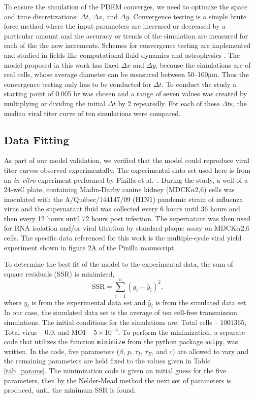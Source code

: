 To ensure the simulation of the PDEM converges, we need to optimize the space and time discretizations: $\Delta t$, $\Delta x$, and $\Delta y$. Convergence testing is a simple brute force method where the input parameters are increased or decreased by a particular amount and the accuracy or trends of the simulation are measured for each of the the new increments. Schemes for convergence testing are implemented and studied in fields like computational fluid dynamics \citep{bermejo16,kim20fluid} and astrophysics \citep{xu21,banei21}. The model proposed in this work has fixed $\Delta x$ and $\Delta y$, because the simulations are of real cells, whose average diameter can be measured between \numrange[range-phrase = --]{50}{100}\si{\micro\meter}. Thus the convergence testing only has to be conducted for $\Delta t$. To conduct the study a starting point of 0.005 hr was chosen and a range of seven values was created by multiplying or dividing the initial $\Delta t$ by 2 repeatedly. For each of these $\Delta t$s, the median viral titer curve of ten simulations were compared.

\subsection{Data Fitting} \label{Data_Fitting}

As part of our model validation, we verified that the model could reproduce viral titer curves observed experimentally. The experimental data set used here is from an \emph{in vitro} experiment performed by Pinilla et al.\ \citep{pinilla12}. During the study, a well of a 24-well plate, containing Madin-Darby canine kidney (MDCK$\alpha$2,6) cells was inoculated with the A/Qu\'{e}bec/144147/09 (H1N1) pandemic strain of influenza virus and the supernatant fluid was collected every 6 hours until 36 hours and then every 12 hours until 72 hours post infection. The supernatant was then used for RNA isolation and/or viral titration by standard plaque assay on MDCK$\alpha$2,6 cells. The specific data referenced for this work is the multiple-cycle viral yield experiment shown in figure 2A of the Pinilla manuscript.

To determine the best fit of the model to the experimental data, the sum of square residuals (SSR) is minimized, $$\mathrm{SSR} = \sum_{i=1}^{n} (y_i - \hat y_i)^{2},$$ where $y_i$ is from the experimental data set and $\hat y_i$ is from the simulated data set. In our case, the simulated data set is the average of ten cell-free transmission simulations. The initial conditions for the simulations are: Total cells -- $1001365$, Total virus -- $0.0$, and MOI -- $5\times 10^{-5}$. To perform the minimization, a separate code that utilizes the function \texttt{minimize} from the python package \texttt{scipy}, was written. In the code, five parameters ($\beta$, $p$, $\tau_I$, $\tau_E$, and $c$) are allowed to vary and the remaining parameters are held fixed to the values given in Table \ref{tab_params}. The minimization code is given an initial guess for the five parameters, then by the Nelder-Mead method the next set of parameters is produced, until the minimum SSR is found.
